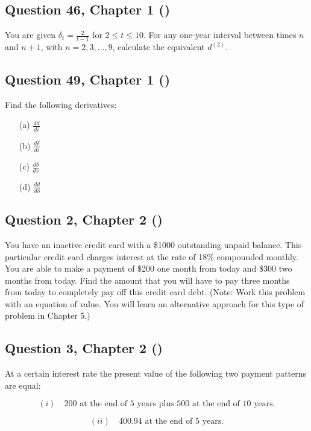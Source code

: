 \documentclass[12pt, a4paper]{article}
\begin{document}
\subsection*{Question 46, Chapter 1  (\cite{toi3rd})}
\noindent You are given \( \delta_t = \frac{2}{t-1} \) for \( 2 \leq t \leq 10 \). For any one-year interval between times \( n \) and \( n + 1 \), with \( n = 2, 3, \dots, 9 \), calculate the equivalent \( d^{(2)} \).

\subsection*{Question 49, Chapter 1  (\cite{toi3rd})}
\noindent Find the following derivatives:
\begin{enumerate}
    \item[(a)] \( \frac{dd}{di} \)
    \item[(b)] \( \frac{d\delta}{di} \)
    \item[(c)] \( \frac{d\delta}{dv} \)
    \item[(d)] \( \frac{dd}{d\delta} \)
\end{enumerate}


\subsection*{Question 2, Chapter 2 (\cite{toi3rd})}

\noindent You have an inactive credit card with a \$1000 outstanding unpaid balance. This particular credit card charges interest at the rate of 18\% compounded monthly. You are able to make a payment of \$200 one month from today and \$300 two months from today. Find the amount that you will have to pay three months from today to completely pay off this credit card debt. (Note: Work this problem with an equation of value. You will learn an alternative approach for this type of problem in Chapter 5.)

\bigskip


\subsection*{Question 3, Chapter 2 (\cite{toi3rd})}

\noindent At a certain interest rate the present value of the following two payment patterns are equal:

\[
(i) \quad 200 \text{ at the end of 5 years plus } 500 \text{ at the end of 10 years.}
\]

\[
(ii) \quad 400.94 \text{ at the end of 5 years.}
\]
\end{document}
